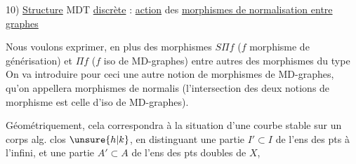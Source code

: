10) \uline{Structure} MDT \uline{discrète} : \uline{action} des \uline{morphismes de normalisation entre graphes}

Nous voulons exprimer, en plus des morphismes
$S\Pi f$ ($f$ morphisme de générisation) et $\Pi f$ ($f$ iso de MD-graphes)
entre autres des morphismes du type
On va introduire pour ceci une autre notion de morphismes de MD-graphes,
qu'on appellera morphismes de normalis
(l'intersection des deux notions de morphisme est celle d'iso de MD-graphes).

Géométriquement, cela correspondra à la situation d'une courbe stable
sur un corps alg. clos $\unsure{h|k}$, en distinguant une partie $I'\subset I$
de l'ens des pts à l'infini, et une partie $A'\subset A$ de l'ens des pts doubles de $X$,
